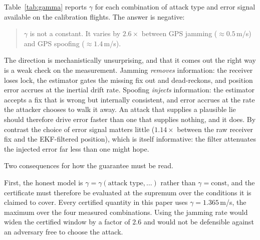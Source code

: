 Table~\ref{tab:gamma} reports $\gamma$ for each combination of attack type and
error signal available on the calibration flights. The answer is negative:

\begin{quote}
$\gamma$ is not a constant. It varies by $2.6\times$ between GPS jamming
($\approx0.5$\,m/s) and GPS spoofing ($\approx1.4$\,m/s).
\end{quote}

The direction is mechanistically unsurprising, and that it comes out the right
way is a weak check on the measurement. Jamming \emph{removes} information: the
receiver loses lock, the estimator gates the missing fix out and dead-reckons,
and position error accrues at the inertial drift rate. Spoofing \emph{injects}
information: the estimator accepts a fix that is wrong but internally
consistent, and error accrues at the rate the attacker chooses to walk it away.
An attack that supplies a plausible lie should therefore drive error faster than
one that supplies nothing, and it does. By contrast the choice of error signal
matters little ($1.14\times$ between the raw receiver fix and the EKF-filtered
position), which is itself informative: the filter attenuates the injected error
far less than one might hope.

\begin{table}[t]
\centering
\caption{The delay-to-position rate $\gamma$ is attack-type dependent. Measured
on the three calibration flights of the . The
certificate consumes the maximum over observed conditions, which is the
conservative choice; the spread is a lower bound on $\gamma$'s true variability,
since the release fixes platform, airspeed, flight mode, attack intensity, and
attack duration. Generated by .}
\label{tab:gamma}
\small
\renewcommand{\arraystretch}{1.05}

\end{table}

Two consequences for how the guarantee must be read.

First, the honest model is $\gamma=\gamma(\text{attack type},\ldots)$ rather
than $\gamma=\text{const}$, and the certificate must therefore be evaluated at
the supremum over the conditions it is claimed to cover. Every certified
quantity in this paper uses $\gamma=1.365$\,m/s, the maximum over the four
measured combinations. Using the jamming rate would widen the certified window
by a factor of $2.6$ and would not be defensible against an adversary free to
choose the attack.

